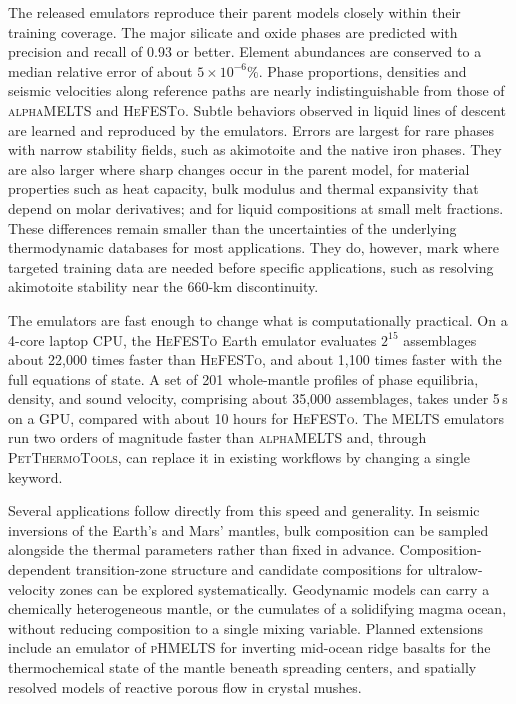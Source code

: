 The released emulators reproduce their parent models closely within their training coverage. The major silicate and oxide phases are predicted
with precision and recall of 0.93 or better. Element abundances are conserved to a median relative error of about $5\times10^{-6}\%$.
Phase proportions, densities and seismic velocities along reference paths are nearly indistinguishable
from those of \textsc{alphaMELTS} and \textsc{HeFESTo}. Subtle behaviors observed in liquid lines of descent are learned and reproduced by the emulators. 
Errors are largest for rare phases with narrow stability fields, such as akimotoite and the native iron phases. They are also larger where sharp changes occur in the parent model, 
for material properties such as heat capacity, bulk modulus and thermal expansivity that depend on molar derivatives; and for liquid compositions at small melt fractions. 
These differences remain smaller than the uncertainties of the underlying thermodynamic databases for most applications. They do, however, mark where
targeted training data are needed before specific applications, such as resolving akimotoite stability near the 660-km discontinuity.

The emulators are fast enough to change what is computationally practical. On a 4-core laptop CPU, the \textsc{HeFESTo} Earth
emulator evaluates $2^{15}$ assemblages about 22{,}000 times faster than \textsc{HeFESTo}, and about 1{,}100 times faster with the
full equations of state. A set of 201 whole-mantle profiles of phase equilibria, density, and sound velocity, comprising about 35{,}000 assemblages, takes under 5\,s on a GPU,
compared with about 10 hours for \textsc{HeFESTo}. The \textsc{MELTS} emulators run two orders of magnitude faster than
\textsc{alphaMELTS} and, through \textsc{PetThermoTools}, can replace it in existing workflows by changing a single keyword.

Several applications follow directly from this speed and generality. In seismic inversions of the Earth's and Mars' mantles, bulk
composition can be sampled alongside the thermal parameters rather than fixed in advance. Composition-dependent transition-zone
structure and candidate compositions for ultralow-velocity zones can be explored systematically. Geodynamic models can carry a
chemically heterogeneous mantle, or the cumulates of a solidifying magma ocean, without reducing composition to a single mixing
variable. Planned extensions include an emulator of \textsc{pHMELTS} for inverting mid-ocean ridge basalts for the thermochemical
state of the mantle beneath spreading centers, and spatially resolved models of reactive porous flow in crystal mushes.


